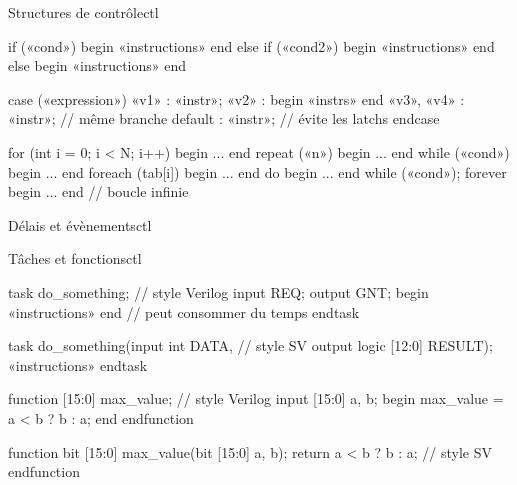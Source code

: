 \documentclass{article}
\begin{document}
\begin{colonne}
\begin{bloc}{Structures de contrôle}{ctl}
\begin{code}
if («cond») begin
  «instructions»
end else if («cond2») begin
  «instructions»
end else begin
  «instructions»
end

case («expression»)
  «v1»      : «instr»;
  «v2»      : begin «instrs» end
  «v3», «v4»  : «instr»;      // même branche
  default : «instr»;      // évite les latchs
endcase

for (int i = 0; i < N; i++) begin ... end
repeat («n»)       begin ... end
while («cond»)     begin ... end
foreach (tab[i]) begin ... end
do begin ... end while («cond»);
forever begin ... end         // boucle infinie
\end{code}
\end{bloc}

\begin{bloc}{Délais et évènements}{ctl}
\end{bloc}

\begin{bloc}{Tâches et fonctions}{ctl}
\begin{code}
task do_something;           // style Verilog
  input  REQ;
  output GNT;
  begin «instructions» end     // peut consommer du temps
endtask

task do_something(input  int          DATA,   // style SV
                  output logic [12:0] RESULT);
  «instructions»
endtask

function [15:0] max_value;   // style Verilog
  input [15:0] a, b;
  begin max_value = a < b ? b : a; end
endfunction

function bit [15:0] max_value(bit [15:0] a, b);
  return a < b ? b : a;      // style SV
endfunction
\end{code}
\end{bloc}
\end{colonne}
\end{document}
